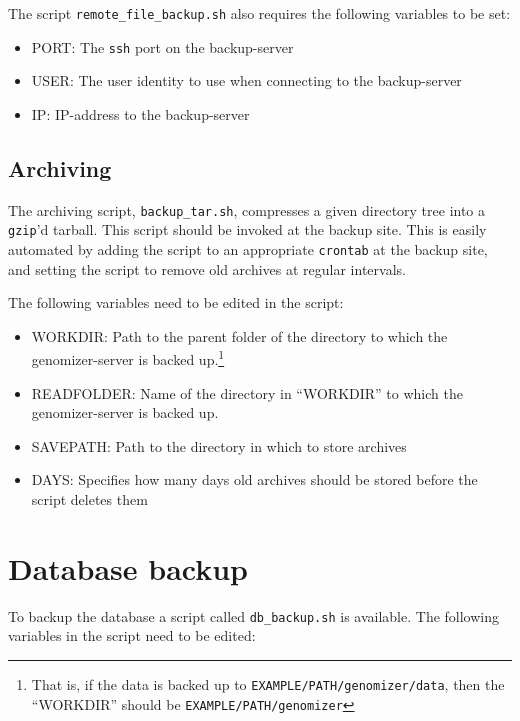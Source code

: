The script \texttt{remote\_file\_backup.sh} also requires the following variables to be set:
\begin{itemize}
\item PORT: The \texttt{ssh} port on the backup-server
\item USER: The user identity to use when connecting to the backup-server
\item IP: IP-address to the backup-server
\end{itemize}


\subsection{Archiving}

The archiving script, \texttt{backup\_tar.sh}, compresses a given
directory tree into a \texttt{gzip}'d tarball. This script should be
invoked at the backup site. This is easily automated by adding the
script to an appropriate \texttt{crontab} at the backup site, and
setting the script to remove old archives at regular intervals.

The following variables need to be edited in the script:
\begin{itemize}
\item WORKDIR: Path to the parent folder of the directory to which the
  genomizer-server is backed up.\footnote{That is, if the data is
    backed up to \texttt{EXAMPLE/PATH/genomizer/data}, then the
    ``WORKDIR'' should be \texttt{EXAMPLE/PATH/genomizer} }
\item READFOLDER: Name of the directory in ``WORKDIR'' to which the
  genomizer-server is backed up.
\item SAVEPATH: Path to the directory in which to store archives 
\item DAYS: Specifies how many days old archives should be stored
  before the script deletes them
\end{itemize}

\section{Database backup}

To backup the database a script called \texttt{db\_backup.sh} is
available. The following variables in the script need to be edited:

